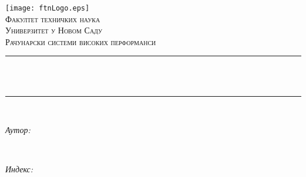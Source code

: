 \begin{titlepage}
	\centering
    \vspace*{0.5 cm}
    \texttt{[image: ftnLogo.eps]}\\[1.0 cm]
    \textsc{\LARGE Факултет техничких наука}\\[0.5 cm]	                    %
	\textsc{\Large Универзитет у Новом Саду}\\[1.0 cm]				        %
	\textsc{\large Рачунарски системи високих перформанси}\\[0.5 cm]		%
        \vspace{\fill}
	\rule{\linewidth}{0.2 mm} \\[0.4 cm]
	{ \huge \bfseries \thetitle}\\
	\rule{\linewidth}{0.2 mm} \\[1.5 cm]
	\begin{minipage}{0.4\textwidth}
		\begin{flushleft} \large
			\emph{Аутор:}\\
			\theauthor
			\end{flushleft}
			\end{minipage}~
			\begin{minipage}{0.4\textwidth}
			\begin{flushright} \large
			\emph{Индекс:} \\
			\theindex								                        %
		\end{flushright}
	\end{minipage}\\[2.0 cm]
	
	{\large \thedate}\\[2 cm]
        \vfill
\end{titlepage}